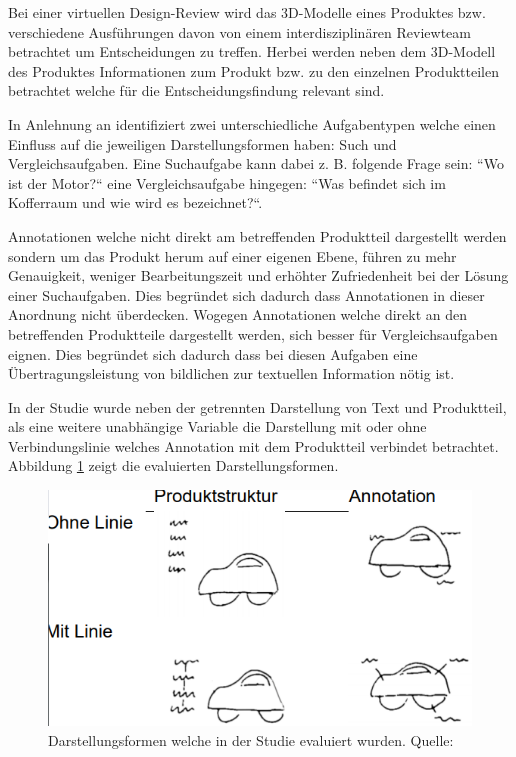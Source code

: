 Bei einer virtuellen Design-Review wird das 3D-Modelle eines Produktes bzw. verschiedene Ausführungen davon von einem interdisziplinären Reviewteam betrachtet um Entscheidungen zu treffen. 
Herbei werden neben dem 3D-Modell des Produktes Informationen zum Produkt bzw. zu den einzelnen Produktteilen betrachtet welche für die Entscheidungsfindung relevant sind. \cite[S.~32]{Brandenburg2019}
 
In Anlehnung an \cite{Polys2004} \cite{Polys2007} identifiziert \citeauthor{Brandenburg2019} zwei unterschiedliche Aufgabentypen welche einen Einfluss auf die jeweiligen Darstellungsformen haben: Such und Vergleichsaufgaben. 
Eine Suchaufgabe kann dabei z. B. folgende Frage sein: ``Wo ist der Motor?`` eine Vergleichsaufgabe hingegen: ``Was befindet sich im Kofferraum und wie wird es bezeichnet?``. \cite[S.~52]{Brandenburg2019}

Annotationen welche nicht direkt am betreffenden Produktteil dargestellt werden sondern um das Produkt herum auf einer eigenen Ebene, führen zu mehr Genauigkeit, weniger Bearbeitungszeit und erhöhter Zufriedenheit bei der Lösung einer Suchaufgaben. Dies begründet sich dadurch dass Annotationen in dieser Anordnung nicht überdecken. Wogegen Annotationen welche direkt an den betreffenden Produktteile dargestellt werden, sich besser für Vergleichsaufgaben eignen. Dies begründet sich dadurch dass bei diesen Aufgaben eine Übertragungsleistung von bildlichen zur textuellen Information nötig ist. \cite[S.~52]{Brandenburg2019} 

In der Studie wurde neben der getrennten Darstellung von Text und Produktteil, als eine weitere unabhängige Variable die Darstellung mit oder ohne Verbindungslinie welches Annotation mit dem Produktteil 
verbindet betrachtet. Abbildung \ref{img:uv} zeigt die evaluierten Darstellungsformen.

\begin{figure}[H]
	\centering 
	\includegraphics[width=.6\textwidth]{resources/analyse/brandenburg_uv.png}
	\caption{Darstellungsformen welche in der Studie evaluiert wurden. Quelle: \cite[S.~127]{Brandenburg2019}}
	\label{img:uv}
\end{figure}

